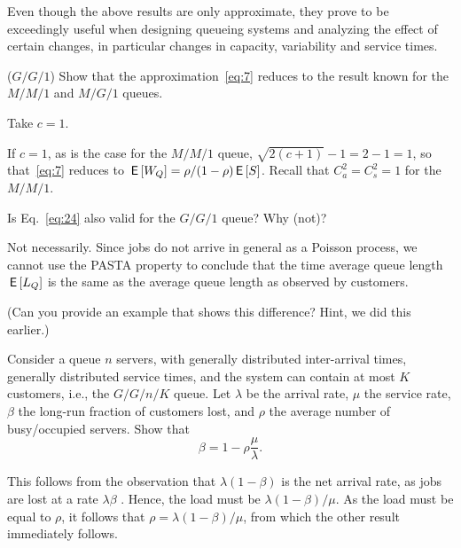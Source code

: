 Even though the above results are only approximate, they prove to be
exceedingly useful when designing queueing systems and analyzing the
effect of certain changes, in particular  changes in capacity,
variability and service times.

\begin{exercise}($G/G/1$)
  Show that the approximation~\eqref{eq:7} reduces to the result known for the $M/M/1$ and $M/G/1$ queues.
  \begin{hint}
 Take $c=1$.
  \end{hint}
  \begin{solution}
    If $c=1$, as is the case for the $M/M/1$ queue, $\sqrt{2(c+1)} - 1=2-1=1$, so that~\eqref{eq:7} reduces to $\,\mathsf{E}\left[W_Q\right] = \rho/(1-\rho) \,\mathsf{E}\left[S\right]$. Recall that $C_a^2=C_s^2=1$ for the $M/M/1$. 
  \end{solution}
\end{exercise}





\begin{exercise}
  Is Eq.~\eqref{eq:24} also valid for the $G/G/1$ queue? Why (not)?
  \begin{solution}
    Not necessarily. Since jobs do not arrive in general as a Poisson
    process, we cannot use the PASTA property to conclude that the
    time average queue length $\,\mathsf{E}\left[L_Q\right]$ is the same as the average
    queue length as observed by customers.

(Can you provide an example that shows this difference?
    Hint, we did this earlier.)
  \end{solution}
\end{exercise}



\begin{exercise}
  Consider a queue $n$ servers, with generally distributed
  inter-arrival times, generally distributed service times, and the
  system can contain at most $K$ customers, i.e., the $G/G/n/K$ queue.
  Let $\lambda$ be the arrival rate, $\mu$ the service rate, $\beta$
  the long-run fraction of customers lost, and $\rho$  the average
  number of busy/occupied servers.
  Show that 
  \begin{equation*}
    \beta = 1 - \rho\frac{\mu}{\lambda}.
  \end{equation*}
\begin{solution}
  This follows from the observation that $\lambda(1-\beta)$ is the net
  arrival rate, as jobs are lost at a rate $\lambda\beta$ . Hence, the
  load must be $\lambda(1-\beta)/\mu$. As the load must be equal to
  $\rho$, it follows that $\rho = \lambda(1-\beta)/\mu$, from which the
  other result immediately follows.
\end{solution}
\end{exercise}

